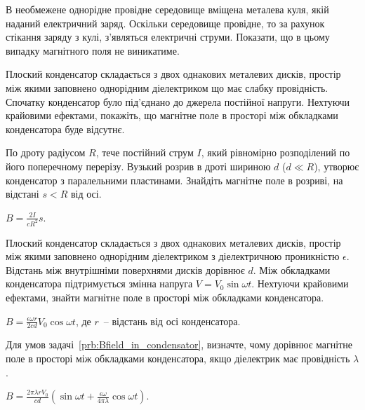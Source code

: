 \begin{problem}
В необмежене однорідне провідне середовище вміщена металева куля, якій наданий електричний заряд. Оскільки середовище провідне, то за рахунок стікання заряду з кулі, з'являться електричні струми. Показати, що в цьому випадку магнітного поля не виникатиме.
\end{problem}

\begin{problem}
Плоский конденсатор складається з двох однакових металевих дисків, простір між якими заповнено однорідним діелектриком що має слабку провідність.
Спочатку конденсатор було під'єднано до джерела постійної напруги. Нехтуючи крайовими ефектами, покажіть, що магнітне поле в просторі між обкладками
конденсатора буде відсутнє.
\end{problem}

\begin{problem}\label{prb:Griffiths7.34}
По дроту радіусом $R$, тече постійний струм $I$, який рівномірно розподілений по його поперечному перерізу. Вузький розрив в дроті шириною $d$ ($d \ll R$), утворює конденсатор з паралельними пластинами. Знайдіть магнітне поле в розриві, на відстані $s < R$ від осі.
\begin{solution}
	$B = \frac{2I}{cR^2}s$.
\end{solution}
\end{problem}


\begin{problem}\label{prb:Bfield_in_condensator}
Плоский конденсатор складається з двох однакових металевих дисків, простір між якими заповнено однорідним діелектриком з діелектричною проникністю $\epsilon$. Відстань між внутрішніми поверхнями дисків дорівнює $d$. Між обкладками конденсатора підтримується змінна напруга $V = V_0\sin\omega t$. Нехтуючи крайовими ефектами, знайти магнітне поле в просторі між обкладками конденсатора.
\begin{solution}
	$B = \frac{\epsilon\omega r}{2cd}V_0\cos\omega t$, де $r$~-- відстань від осі конденсатора.
\end{solution}
 \end{problem}

\begin{problem}\label{prb:Bfield_in_condensator_with_currnet}
    Для умов задачі~\ref{prb:Bfield_in_condensator}, визначте, чому дорівнює  магнітне поле в просторі між обкладками конденсатора, якщо діелектрик має провідність $\lambda$.
\begin{solution}
	$B = \frac{2\pi\lambda r V_0}{cd}\left( \sin\omega t + \frac{\epsilon \omega}{4\pi\lambda}\cos\omega t\right) $.
\end{solution}
\end{problem}

